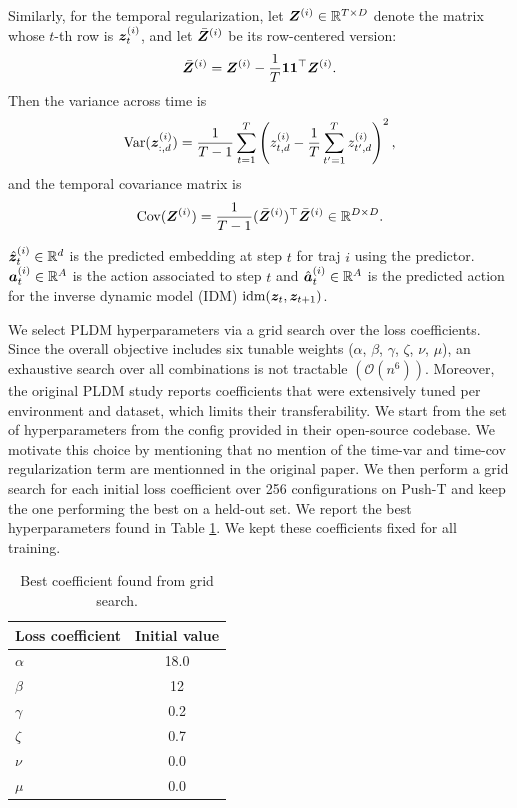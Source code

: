 Similarly, for the temporal regularization, let ${\bm{Z}}^{(i)} \in \mathbb{R}^{T \times D}$ denote the matrix whose $t$-th row is ${\bm{z}}_t^{(i)}$, and let $\bar{{\bm{Z}}}^{(i)}$ be its row-centered version:
\[
\bar{{\bm{Z}}}^{(i)} = {\bm{Z}}^{(i)} - \frac{1}{T}\mathbf{1}\mathbf{1}^\top {\bm{Z}}^{(i)} .
\]
Then the variance across time is
\[
\mathrm{Var}({\bm{z}}^{(i)}_{:,d})
=
\frac{1}{T-1}\sum_{t=1}^T
\left(
z^{(i)}_{t,d} - \frac{1}{T}\sum_{t'=1}^T z^{(i)}_{t',d}
\right)^2 ,
\]
and the temporal covariance matrix is
\[
\mathrm{Cov}({\bm{Z}}^{(i)})
=
\frac{1}{T-1}(\bar{{\bm{Z}}}^{(i)})^\top \bar{{\bm{Z}}}^{(i)}
\in \mathbb{R}^{D \times D}.
\]

$\hat{{\bm{z}}}^{(i)}_{t} \in \mathbb{R}^{d}$ is the predicted embedding at step $t$ for traj $i$ using the predictor. ${\bm{a}}^{(i)}_{t} \in \mathbb{R}^{A}$ is the action associated to step $t$ and $\hat{{\bm{a}}}^{(i)}_{t} \in \mathbb{R}^{A}$ is the predicted action for the inverse dynamic model (IDM) $\text{idm}({\bm{z}}_t, {\bm{z}}_{t+1})$.

We select PLDM hyperparameters via a grid search over the loss coefficients. Since the overall objective includes six tunable weights ($\alpha$, $\beta$, $\gamma$, $\zeta$, $\nu$, $\mu$), an exhaustive search over all combinations is not tractable $(\mathcal{O}(n^6))$. Moreover, the original PLDM study reports coefficients that were extensively tuned per environment and dataset, which limits their transferability. We start from the set of hyperparameters from the config provided in their open-source codebase. We motivate this choice by mentioning that no mention of the time-var and time-cov regularization term are mentionned in the original paper. We then perform a grid search for each initial loss coefficient over 256 configurations on Push-T and keep the one performing the best on a held-out set. We report the best hyperparameters found in Table \ref{tab:pldm_init_coeffs}. We kept these coefficients fixed for all training.

\begin{table}[h]
\centering
\begin{tabular}{l c}
\toprule
\textbf{Loss coefficient} & \textbf{Initial value} \\

\toprule
$\alpha$ & 18.0 \\
$\beta$  & 12   \\
$\gamma$ & 0.2  \\
$\zeta$  & 0.7  \\
$\nu$    & 0.0  \\
$\mu$    & 0.0  \\
\bottomrule
\end{tabular}
\vspace{2mm}
\caption{Best coefficient found from grid search.}
\label{tab:pldm_init_coeffs}
\end{table}

